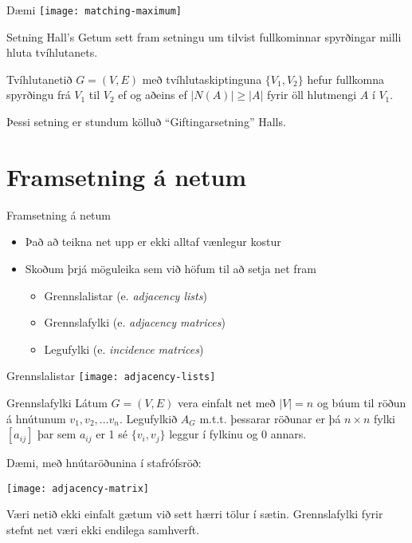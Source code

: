 \documentclass{beamer}
\begin{document}
\begin{frame}{Dæmi}
\texttt{[image: matching-maximum]}
\end{frame}

\begin{frame}{Setning Hall's}
Getum sett fram setningu um tilvist fullkominnar spyrðingar milli hluta tvíhlutanets.

\begin{tcolorbox}[title=Setning Halls]
Tvíhlutanetið $G = (V, E)$ með tvíhlutaskiptinguna $\{V_1, V_2\}$ hefur fullkomna spyrðingu frá $V_1$ til $V_2$ ef og aðeins ef $|N(A)| \geq |A|$ fyrir öll hlutmengi $A$ í $V_1$.
\end{tcolorbox}

Þessi setning er stundum kölluð ``Giftingarsetning'' Halls.
\end{frame}

\section{Framsetning á netum}

\begin{frame}{Framsetning á netum}
\begin{itemize}
 \item Það að teikna net upp er ekki alltaf vænlegur kostur
 \item Skoðum þrjá möguleika sem við höfum til að setja net fram
 \begin{itemize}
  \item Grennslalistar (e. \emph{adjacency lists})
  \item Grennslafylki (e. \emph{adjacency matrices})
  \item Legufylki (e. \emph{incidence matrices})
 \end{itemize}
\end{itemize}
\end{frame}

\begin{frame}{Grennslalistar}
\texttt{[image: adjacency-lists]}
\end{frame}

\begin{frame}{Grennslafylki}
Látum $G = (V, E)$ vera einfalt net með $|V| = n$ og búum til röðun á hnútunum $v_1, v_2, \ldots v_n$. Legufylkið $A_G$ m.t.t. þessarar röðunar er þá $n \times n$ fylki $[a_{ij}]$ þar sem $a_{ij}$ er 1 sé $\{v_i,v_j\}$ leggur í fylkinu og 0 annars.

Dæmi, með hnútaröðunina í stafrófsröð:
\begin{center}
\texttt{[image: adjacency-matrix]}
\end{center}
Væri netið ekki einfalt gætum við sett hærri tölur í sætin. Grennslafylki fyrir stefnt net væri ekki endilega samhverft.
\end{frame}
\end{document}
